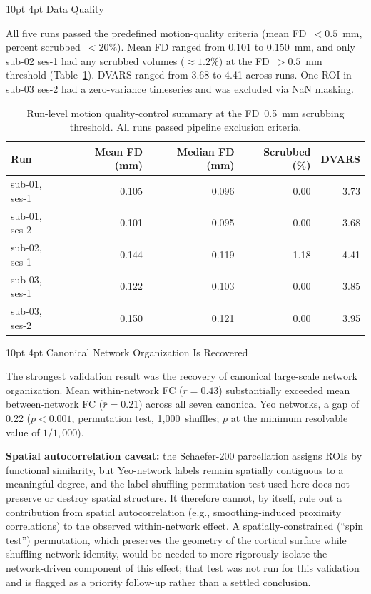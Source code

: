 \documentclass[12pt]{article}
\makeatletter
\renewcommand\subsection{%
  \@startsection{subsection}{2}{\z@}%
    {10pt \@plus 2pt \@minus 1pt}%
    {4pt}%
    {\normalfont\normalsize\bfseries}}
\makeatother
\begin{document}
\subsection{Data Quality}

All five runs passed the predefined motion-quality criteria
(mean FD~$< 0.5$~mm, percent scrubbed~$< 20\%$). Mean FD ranged from
0.101 to 0.150~mm, and only sub-02 ses-1 had any scrubbed volumes
($\approx\!1.2\%$) at the FD~$> 0.5$~mm threshold (Table~\ref{tab:qc}).
DVARS ranged from 3.68 to 4.41 across runs. One ROI in sub-03 ses-2
had a zero-variance timeseries and was excluded via NaN masking.

\begin{table}[h]
\centering
\small
\caption{Run-level motion quality-control summary at the FD~0.5~mm
  scrubbing threshold. All runs passed pipeline exclusion criteria.}
\label{tab:qc}
\begin{tabular}{lrrrr}
\toprule
\textbf{Run} & \textbf{Mean FD (mm)} & \textbf{Median FD (mm)} &
  \textbf{Scrubbed (\%)} & \textbf{DVARS} \\
\midrule
sub-01, ses-1 & 0.105 & 0.096 & 0.00 & 3.73 \\
sub-01, ses-2 & 0.101 & 0.095 & 0.00 & 3.68 \\
sub-02, ses-1 & 0.144 & 0.119 & 1.18 & 4.41 \\
sub-03, ses-1 & 0.122 & 0.103 & 0.00 & 3.85 \\
sub-03, ses-2 & 0.150 & 0.121 & 0.00 & 3.95 \\
\bottomrule
\end{tabular}
\end{table}

\subsection{Canonical Network Organization Is Recovered}

The strongest validation result was the recovery of canonical
large-scale network organization. Mean within-network FC
($\bar{r} = 0.43$) substantially exceeded mean between-network FC
($\bar{r} = 0.21$) across all seven canonical Yeo networks, a gap of
0.22 ($p < 0.001$, permutation test, 1,000~shuffles; $p$ at the
minimum resolvable value of $1/1{,}000$).

\textbf{Spatial autocorrelation caveat:} the Schaefer-200 parcellation
assigns ROIs by functional similarity, but Yeo-network labels remain
spatially contiguous to a meaningful degree, and the label-shuffling
permutation test used here does not preserve or destroy spatial
structure. It therefore cannot, by itself, rule out a contribution from
spatial autocorrelation (e.g., smoothing-induced proximity correlations)
to the observed within-network effect. A spatially-constrained
(``spin test'') permutation, which preserves the geometry of the
cortical surface while shuffling network identity, would be needed to
more rigorously isolate the network-driven component of this effect;
that test was not run for this validation and is flagged as a priority
follow-up rather than a settled conclusion.
\end{document}
